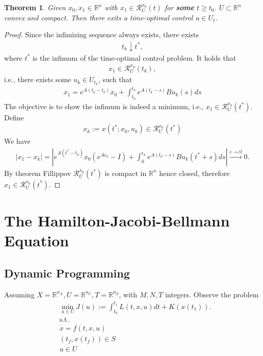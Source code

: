 \documentclass[a4paper,11pt,fleqn]{book}
\newtheorem{theorem}{Theorem}[section]
\theoremstyle{definition}
\theoremstyle{remark}
\begin{document}
\begin{theorem}
	Given $x_0, x_1 \in \mathbb{R}^n$ with $x_1 \in \mathcal{R}_U^{x_0}(t)$ for \textbf{some} $t \ge t_0$. $U \subset \mathbb{R}^n$ convex and compact. Then there exits a time-optimal control $u \in U_t$. 
\end{theorem}
\begin{proof}
	Since the infimizing sequence always exists, there exists 
	\begin{align*}
		t_k \downarrow t^*,
	\end{align*}
	where $t^*$ is the infimum of the time-optimal control problem. It holds that 
	\begin{align*}
		x_1 \in \mathcal{R}_U^{x_0}(t_k),
	\end{align*}
	i.e., there exists some $u_k \in U_{t_k}$, such that
	\begin{align*}
		x_1 = e^{A(t_k - t_0)}x_0 + \int_{t_0}^{t_k} e^{A(t_k - s)} Bu_k(s) ds 
	\end{align*}
	The objective is to show the infimum is indeed a minimum, i.e., $x_1 \in \mathcal{R}_U^{x_0}(t^*)$. Define
	\begin{align*}
		x_k:= x(t^*; x_0, u_k) \in \mathcal{R}_U^{x_0}(t^*)
	\end{align*}
	We have
	\begin{align*}
		|x_1 - x_k| = |e^{A(t^* - t_0)}x_0(e^{A \epsilon_k} - I) + \int_0^{\epsilon_k} e^{A(t_k - s)} Bu_k(t^* + s)ds| \overset{\epsilon \rightarrow 0 }{\longrightarrow} 0 .
	\end{align*}
	By theorem Fillippov $\mathcal{R}^{x_0}_U(t^*)$ is compact in $\mathbb{R}^n$ hence closed, therefore $x_1 \in \mathcal{R}_U^{x_0}(t^*)$. 
\end{proof}



\section{The Hamilton-Jacobi-Bellmann Equation}
\subsection{Dynamic Programming}
Assuming $X = \mathbb{R}^{n_X}, U = \mathbb{R}^{n_U}, T = \mathbb{R}^{n_T}$, with $M, N, T$ integers. Observe the problem
\begin{align*}
	\tag{$P_D$}
	& \min_{u \in U} J(u):= \int_{t_0}^{t_1} L(t, x, u)dt + K(x(t_1)). \\
	&\text{s.t.}\\
	& \dot{x} = f(t, x, u)\\
	& (t_f, x(t_f)) \in S\\
	& u \in U
\end{align*}
\end{document}
